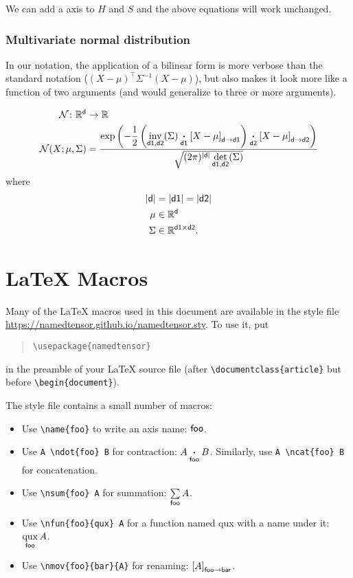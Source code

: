 \documentclass{article}
\newcommand{\reals}{\mathbb{R}}
\begin{document}
We can add a  axis to $H$ and $S$ and the above equations will work unchanged.

\subsubsection{Multivariate normal distribution}

In our notation, the application of a bilinear form is more verbose than the standard notation ($(X-\mu)^\top \Sigma^{-1} (X-\mu)$), but also makes it look more like a function of two arguments (and would generalize to three or more arguments).

\begin{align*}
\mathcal{N} \colon \reals^{\name{d}} &\rightarrow \reals \\
\mathcal{N}(X; \mu, \Sigma) &= \frac{\displaystyle \exp\left(-\frac{1}{2}  \left(\nfun{d1, d2}{inv}(\Sigma) \ndot{d1} \nmov{d}{d1}{X - \mu} \right) \ndot{d2} \nmov{d}{d2}{X - \mu} \right)}{\sqrt{(2 \pi)^{|\name{d}|} \nfun{d1, d2}{det}(\Sigma)}}
\end{align*}
where
\begin{align*}
|\name{d}| &= |\name{d1}| = |\name{d2}| \\
\mu &\in \reals^{\name{d}} \\
\Sigma & \in \reals^{\name{d1} \times \name{d2}}.
\end{align*}

\section{\LaTeX{} Macros}

Many of the \LaTeX{} macros used in this document are available in the style file \url{https://namedtensor.github.io/namedtensor.sty}. To use it, put
\begin{quote}
\begin{verbatim}
\usepackage{namedtensor}
\end{verbatim}
\end{quote}
in the preamble of your \LaTeX{} source file (after \verb|\documentclass{article}| but before \verb|\begin{document}|).

The style file contains a small number of macros:
\begin{itemize}
\item Use \verb|\name{foo}| to write an axis name: $\name{foo}$.
\item Use \verb|A \ndot{foo} B| for contraction: $A \ndot{foo} B$. Similarly, use \verb|A \ncat{foo} B| for concatenation.
\item Use \verb|\nsum{foo} A| for summation: $\nsum{foo} A$.
\item Use \verb|\nfun{foo}{qux} A| for a function named qux with a name under it: $\nfun{foo}{qux} A$.
\item Use \verb|\nmov{foo}{bar}{A}| for renaming: $\nmov{foo}{bar}{A}$.
\end{itemize}
\end{document}
